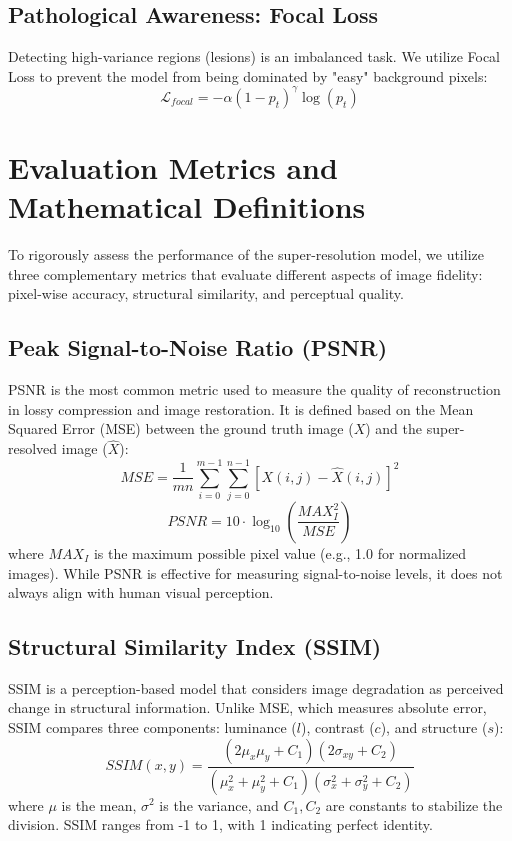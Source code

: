 \subsection{Pathological Awareness: Focal Loss}
Detecting high-variance regions (lesions) is an imbalanced task. We utilize Focal Loss to prevent the model from being dominated by "easy" background pixels:
\begin{equation}
    \mathcal{L}_{focal} = -\alpha (1 - p_t)^\gamma \log(p_t)
\end{equation}

\section{Evaluation Metrics and Mathematical Definitions}
To rigorously assess the performance of the super-resolution model, we utilize three complementary metrics that evaluate different aspects of image fidelity: pixel-wise accuracy, structural similarity, and perceptual quality.

\subsection{Peak Signal-to-Noise Ratio (PSNR)}
PSNR is the most common metric used to measure the quality of reconstruction in lossy compression and image restoration. It is defined based on the Mean Squared Error (MSE) between the ground truth image ($X$) and the super-resolved image ($\hat{X}$):
\begin{equation}
    MSE = \frac{1}{mn} \sum_{i=0}^{m-1} \sum_{j=0}^{n-1} [X(i,j) - \hat{X}(i,j)]^2
\end{equation}
\begin{equation}
    PSNR = 10 \cdot \log_{10} \left( \frac{MAX_I^2}{MSE} \right)
\end{equation}
where $MAX_I$ is the maximum possible pixel value (e.g., 1.0 for normalized images). While PSNR is effective for measuring signal-to-noise levels, it does not always align with human visual perception.

\subsection{Structural Similarity Index (SSIM)}
SSIM is a perception-based model that considers image degradation as perceived change in structural information. Unlike MSE, which measures absolute error, SSIM compares three components: luminance ($l$), contrast ($c$), and structure ($s$):
\begin{equation}
    SSIM(x, y) = \frac{(2\mu_x\mu_y + C_1)(2\sigma_{xy} + C_2)}{(\mu_x^2 + \mu_y^2 + C_1)(\sigma_x^2 + \sigma_y^2 + C_2)}
\end{equation}
where $\mu$ is the mean, $\sigma^2$ is the variance, and $C_1, C_2$ are constants to stabilize the division. SSIM ranges from -1 to 1, with 1 indicating perfect identity.


